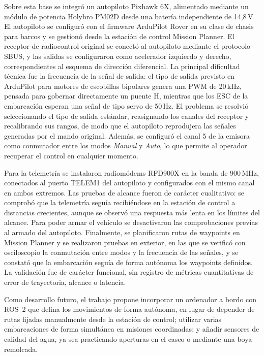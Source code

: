 Sobre esta base se integró un autopiloto Pixhawk 6X, alimentado mediante un módulo de
potencia Holybro PM02D desde una batería independiente de 14,8\,V. El autopiloto se
configuró con el firmware ArduPilot Rover en su clase de chasis para barcos y se
gestionó desde la estación de control Mission Planner. El receptor de radiocontrol
original se conectó al autopiloto mediante el protocolo SBUS, y las salidas se
configuraron como acelerador izquierdo y derecho, correspondientes al esquema de
dirección diferencial. La principal dificultad técnica fue la frecuencia de la señal
de salida: el tipo de salida previsto en ArduPilot para motores de escobillas
bipolares genera una PWM de 20\,kHz, pensada para gobernar directamente un puente H,
mientras que los ESC de la embarcación esperan una señal de tipo servo de 50\,Hz. El
problema se resolvió seleccionando el tipo de salida estándar, reasignando los canales
del receptor y recalibrando sus rangos, de modo que el autopiloto reprodujera las
señales generadas por el mando original. Además, se configuró el canal 5 de la emisora
como conmutador entre los modos \textit{Manual} y \textit{Auto}, lo que permite al
operador recuperar el control en cualquier momento.
 
Para la telemetría se instalaron radiomódems RFD900X en la banda de 900\,MHz,
conectados al puerto TELEM1 del autopiloto y configurados con el mismo canal en ambos
extremos. Las pruebas de alcance fueron de carácter cualitativo: se comprobó que la
telemetría seguía recibiéndose en la estación de control a distancias crecientes,
aunque se observó una respuesta más lenta en los límites del alcance. Para poder armar
el vehículo se desactivaron las comprobaciones previas al armado del autopiloto.
Finalmente, se planificaron rutas de waypoints en Mission Planner y se realizaron
pruebas en exterior, en las que se verificó con osciloscopio la conmutación entre
modos y la frecuencia de las señales, y se constató que la embarcación seguía de forma
autónoma los waypoints definidos. La validación fue de carácter funcional, sin registro
de métricas cuantitativas de error de trayectoria, alcance o latencia.
 
Como desarrollo futuro, el trabajo propone incorporar un ordenador a bordo con ROS~2
que defina los movimientos de forma autónoma, en lugar de depender de rutas fijadas
manualmente desde la estación de control; utilizar varias embarcaciones de forma
simultánea en misiones coordinadas; y añadir sensores de calidad del agua, ya sea
practicando aperturas en el casco o mediante una boya remolcada.
 
